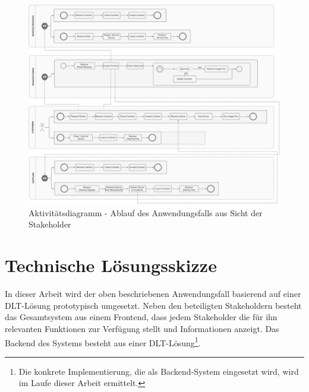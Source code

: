\begin{figure}[htbp]
 \centering
 \includegraphics[width=1.0\textwidth]{gfx/UML_Act_Usecase.png}
 \caption{Aktivitätsdiagramm - Ablauf des Anwendungsfalls aus Sicht der Stakeholder}
 \label{fig:chapter04:usecase_workflow}
\end{figure}

%
%
\section{Technische Lösungsskizze}
\label{sec:iot_usecase:solution}
In dieser Arbeit wird der oben beschriebenen Anwendungsfall basierend auf einer \ac{DLT}-Lösung prototypisch umgesetzt. Neben den beteiligten Stakeholdern besteht das Gesamtsystem aus einem Frontend, dass jedem Stakeholder die für ihn relevanten Funktionen zur Verfügung stellt und Informationen anzeigt. Das Backend des Systems besteht aus einer \ac{DLT}-Lösung\footnote{Die konkrete Implementierung, die als Backend-System eingesetzt wird, wird im Laufe dieser Arbeit ermittelt.}.

